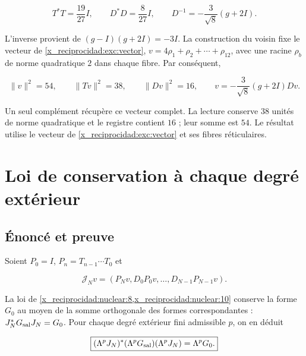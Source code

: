\begin{equation}
T^*T=\frac{19}{27}I,
\qquad D^*D=\frac8{27}I,
\qquad D^{-1}=-\frac3{\sqrt8}(g+2I).
\label{x_reciprocidad:nuc11:eq:18}
\end{equation}



L’inverse provient de \((g-I)(g+2I)=-3I\).
La construction du voisin fixe le vecteur de
\eqref{x_reciprocidad:exc:vector},
\(v=4\rho_1+\rho_2+\cdots+\rho_{12}\), avec une racine
\(\rho_b\) de norme quadratique \(2\) dans chaque fibre.
Par conséquent,



\begin{equation}
\|v\|^2=54,\qquad \|Tv\|^2=38,\qquad \|Dv\|^2=16,
\qquad v=-\frac3{\sqrt8}(g+2I)Dv.
\label{x_reciprocidad:nuc11:eq:19}
\end{equation}



Un seul complément récupère ce vecteur complet.
La lecture conserve \(38\) unités de norme quadratique et le
registre contient \(16\) ; leur somme est \(54\).
Le résultat utilise le vecteur de \eqref{x_reciprocidad:exc:vector} et ses fibres
réticulaires.

\section{Loi de conservation à chaque degré extérieur}

\subsection{Énoncé et preuve}

Soient \(P_0=I\), \(P_n=T_{n-1}\cdots T_0\) et



\[
\mathcal J_Nv=(P_Nv,D_0P_0v,\ldots,D_{N-1}P_{N-1}v).
\]



La loi de \cref{x_reciprocidad:nuclear:8,x_reciprocidad:nuclear:10} conserve la forme \(G_0\)
au moyen de la somme orthogonale des formes correspondantes :
\(\mathcal J_N^*G_{\rm sal}\mathcal J_N=G_0\).
Pour chaque degré extérieur fini admissible \(p\), on en déduit



\begin{equation}
\boxed{
(\Lambda^p\mathcal J_N)^*(\Lambda^pG_{\rm sal})
(\Lambda^p\mathcal J_N)=\Lambda^pG_0.
}
\label{x_reciprocidad:nuc11:eq:20}
\end{equation}



